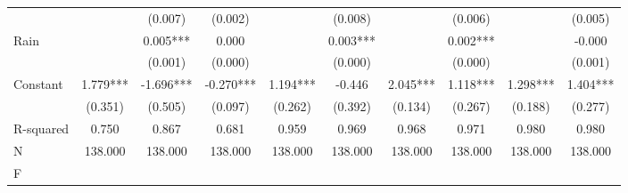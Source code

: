 {\begin{tabular}{l*{9}{c}}
                    &               &     (0.007)   &     (0.002)   &               &     (0.008)   &               &     (0.006)   &               &     (0.005)   \\
Rain                &               &       0.005***&       0.000   &               &       0.003***&               &       0.002***&               &      -0.000   \\
                    &               &     (0.001)   &     (0.000)   &               &     (0.000)   &               &     (0.000)   &               &     (0.001)   \\
Constant            &       1.779***&      -1.696***&      -0.270***&       1.194***&      -0.446   &       2.045***&       1.118***&       1.298***&       1.404***\\
                    &     (0.351)   &     (0.505)   &     (0.097)   &     (0.262)   &     (0.392)   &     (0.134)   &     (0.267)   &     (0.188)   &     (0.277)   \\
\hline
R-squared           &       0.750   &       0.867   &       0.681   &       0.959   &       0.969   &       0.968   &       0.971   &       0.980   &       0.980   \\
N                   &     138.000   &     138.000   &     138.000   &     138.000   &     138.000   &     138.000   &     138.000   &     138.000   &     138.000   \\
F                   &               &               &               &               &               &               &               &               &               \\
\hline\hline
\end{tabular}
}
